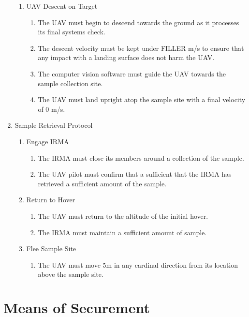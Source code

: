 \begin{enumerate}[noitemsep, label=\arabic*.]
\begin{enumerate}[noitemsep, label=3.\arabic*.]
		\item UAV Descent on Target
		\begin{enumerate}[noitemsep, label=3.3.\arabic*.]
			\item The UAV must begin to descend towards the ground as it processes its final systems check.
			\item The descent velocity must be kept under FILLER m/s to ensure that any impact with a landing surface does not harm the UAV.
			\item The computer vision software must guide the UAV towards the sample collection site.
			\item The UAV must land upright atop the sample site with a final velocity of 0 m/s.
		\end{enumerate}
	\end{enumerate}
	\item Sample Retrieval Protocol
	\begin{enumerate}[noitemsep, label=4.\arabic*.]
		\item Engage IRMA
		\begin{enumerate}[noitemsep, label=4.1.\arabic*.]
			\item The IRMA must close its members around a collection of the sample.
			\item The UAV pilot must confirm that a sufficient that the IRMA has retrieved a sufficient amount of the sample.
		\end{enumerate}
		\item Return to Hover
		\begin{enumerate}[noitemsep, label=4.2.\arabic*.]
			\item The UAV must return to the altitude of the initial hover.
			\item The IRMA must maintain a sufficient amount of sample.
		\end{enumerate}
		\item Flee Sample Site
		\begin{enumerate}[noitemsep, label=4.3.\arabic*.]
			\item The UAV must move 5m in any cardinal direction from its location above the sample site.
		\end{enumerate}
	\end{enumerate}
\end{enumerate}

\section{Means of Securement}\label{PL:Deployment:Securement}
